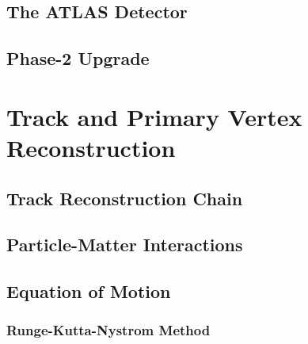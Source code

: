 
\subsection{The ATLAS Detector}


\subsection{Phase-2 Upgrade}


\section{Track and Primary Vertex Reconstruction}


\subsection{Track Reconstruction Chain}


\subsection{Particle-Matter Interactions}


\subsection{Equation of Motion}


\subsubsection{Runge-Kutta-Nystrom Method}

